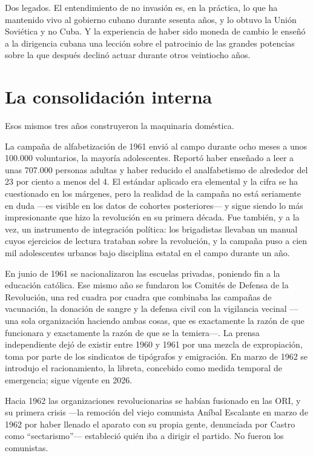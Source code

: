 Dos legados. El entendimiento de no invasión es, en la práctica, lo que ha
mantenido vivo al gobierno cubano durante sesenta años, y lo obtuvo la Unión
Soviética y no Cuba. Y la experiencia de haber sido moneda de cambio le enseñó a
la dirigencia cubana una lección sobre el patrocinio de las grandes potencias
sobre la que después declinó actuar durante otros veintiocho años.

\section{La consolidación interna}

Esos mismos tres años construyeron la maquinaria doméstica.

La campaña de alfabetización de 1961 envió al campo durante ocho meses a unos
100.000 voluntarios, la mayoría adolescentes. Reportó haber enseñado a leer a unas
707.000 personas adultas y haber reducido el analfabetismo de alrededor del 23
por ciento a menos del 4.\unv{} El estándar aplicado era elemental y la cifra se
ha cuestionado en los márgenes, pero la realidad de la campaña no está seriamente
en duda ---es visible en los datos de cohortes posteriores--- y sigue siendo lo
más impresionante que hizo la revolución en su primera década. Fue también, y a
la vez, un instrumento de integración política: los brigadistas llevaban un
manual cuyos ejercicios de lectura trataban sobre la revolución, y la campaña
puso a cien mil adolescentes urbanos bajo disciplina estatal en el campo durante
un año.

En junio de 1961 se nacionalizaron las escuelas privadas, poniendo fin a la
educación católica. Ese mismo año se fundaron los Comités de Defensa de la
Revolución, una red cuadra por cuadra que combinaba las campañas de vacunación,
la donación de sangre y la defensa civil con la vigilancia vecinal ---una sola
organización haciendo ambas cosas, que es exactamente la razón de que funcionara
y exactamente la razón de que se la temiera---. La prensa independiente dejó de
existir entre 1960 y 1961 por una mezcla de expropiación, toma por parte de los
sindicatos de tipógrafos y emigración. En marzo de 1962 se introdujo el
racionamiento, la libreta, concebido como medida temporal de emergencia; sigue
vigente en 2026.

Hacia 1962 las organizaciones revolucionarias se habían fusionado en las ORI, y
su primera crisis ---la remoción del viejo comunista Aníbal Escalante en marzo de
1962 por haber llenado el aparato con su propia gente, denunciada por Castro como
``sectarismo''--- estableció quién iba a dirigir el partido. No fueron los
comunistas.

